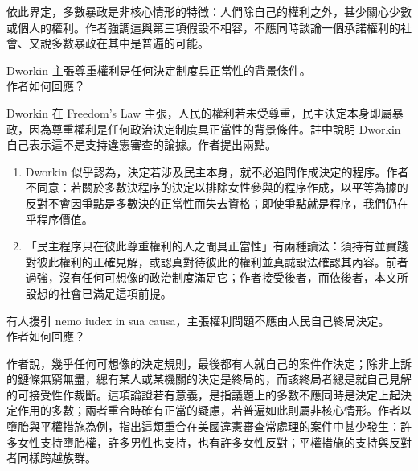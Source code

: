 依此界定，多數暴政是非核心情形的特徵：人們除自己的權利之外，甚少關心少數或個人的權利。作者強調這與第三項假設不相容，不應同時談論一個承諾權利的社會、又說多數暴政在其中是普遍的可能。


\begin{qaquestion}
Dworkin 主張尊重權利是任何決定制度具正當性的背景條件。\\
作者如何回應？
\end{qaquestion}

Dworkin 在 Freedom's Law 主張，人民的權利若未受尊重，民主決定本身即屬暴政，因為尊重權利是任何政治決定制度具正當性的背景條件。註中說明 Dworkin 自己表示這不是支持違憲審查的論據。作者提出兩點。

\begin{enumerate}
\item Dworkin 似乎認為，決定若涉及民主本身，就不必追問作成決定的程序。作者不同意：若關於多數決程序的決定以排除女性參與的程序作成，以平等為據的反對不會因爭點是多數決的正當性而失去資格；即使爭點就是程序，我們仍在乎程序價值。
\item 「民主程序只在彼此尊重權利的人之間具正當性」有兩種讀法：須持有並實踐對彼此權利的正確見解，或認真對待彼此的權利並真誠設法確認其內容。前者過強，沒有任何可想像的政治制度滿足它；作者接受後者，而依後者，本文所設想的社會已滿足這項前提。
\end{enumerate}


\begin{qaquestion}
有人援引 nemo iudex in sua causa，主張權利問題不應由人民自己終局決定。\\
作者如何回應？
\end{qaquestion}

作者說，幾乎任何可想像的決定規則，最後都有人就自己的案件作決定；除非上訴的鏈條無窮無盡，總有某人或某機關的決定是終局的，而該終局者總是就自己見解的可接受性作裁斷。這項論證若有意義，是指議題上的多數不應同時是決定上起決定作用的多數；兩者重合時確有正當的疑慮，若普遍如此則屬非核心情形。作者以墮胎與平權措施為例，指出這類重合在美國違憲審查常處理的案件中甚少發生：許多女性支持墮胎權，許多男性也支持，也有許多女性反對；平權措施的支持與反對者同樣跨越族群。
